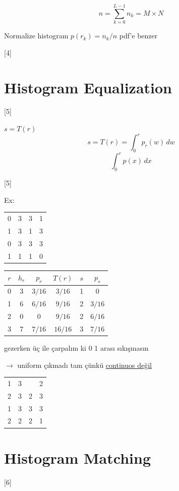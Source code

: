 \documentclass[11pt,a4paper]{article}
\begin{document}
\[ n = \sum_{k=0}^{L-1} n_k = M \times N \]

Normalize histogram \qquad $p(r_k) = n_k / n$ \qquad\qquad pdf'e benzer

[4]

\section{Histogram Equalization}
[5]

$s = T(r)$
\[ s = T(r) = \int_0^r p_r(w)\,dw \]
\[ \int_0^r p(x)\,dx \]

[5]

Ex:

\noindent
\begin{tabular}{|cccc|}\hline 0 & 3 & 3 & 1 \\ 1 & 3 & 1 & 3 \\ 0 & 3 & 3 & 3 \\ 1 & 1 & 1 & 0 \\ \hline\end{tabular}

\bigskip
\noindent
\begin{tabular}{c|c|c|c|c|c}
$r$ & $h_r$ & $p_r$ & $T(r)$ & $s$ & $p_s$ \\ \hline
0 & 3 & $3/16$ & $3/16$ & 1 & 0 \\
1 & 6 & $6/16$ & $9/16$ & 2 & $3/16$ \\
2 & 0 & 0 & $9/16$ & 2 & $6/16$ \\
3 & 7 & $7/16$ & $16/16$ & 3 & $7/16$
\end{tabular}

gezerken üç ile çarpalım ki 0 1 arası sıkışmasın

$\rightarrow$ uniform çıkmadı tam çünkü \underline{continuos değil}

\bigskip
\noindent
\begin{tabular}{|cccc|}\hline 1 & 3 & & 2 \\ 2 & 3 & 2 & 3 \\ 1 & 3 & 3 & 3 \\ 2 & 2 & 2 & 1 \\ \hline\end{tabular}


\section{Histogram Matching}
[6]
\end{document}
